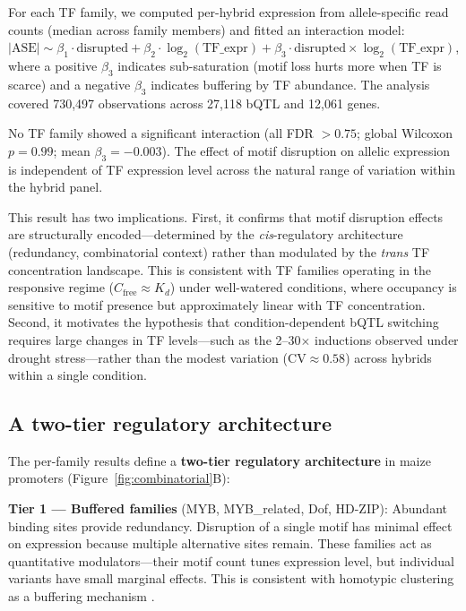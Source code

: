 \documentclass[11pt,a4paper]{article}
\begin{document}
For each TF family, we computed per-hybrid expression from allele-specific read counts (median across family members) and fitted an interaction model: $|\text{ASE}| \sim \beta_1 \cdot \text{disrupted} + \beta_2 \cdot \log_2(\text{TF\_expr}) + \beta_3 \cdot \text{disrupted} \times \log_2(\text{TF\_expr})$, where a positive $\beta_3$ indicates sub-saturation (motif loss hurts more when TF is scarce) and a negative $\beta_3$ indicates buffering by TF abundance. The analysis covered 730,497 observations across 27,118 bQTL and 12,061 genes.

No TF family showed a significant interaction (all FDR $> 0.75$; global Wilcoxon $p = 0.99$; mean $\beta_3 = -0.003$). The effect of motif disruption on allelic expression is independent of TF expression level across the natural range of variation within the hybrid panel.

This result has two implications. First, it confirms that motif disruption effects are structurally encoded---determined by the \emph{cis}-regulatory architecture (redundancy, combinatorial context) rather than modulated by the \emph{trans} TF concentration landscape. This is consistent with TF families operating in the responsive regime ($C_\text{free} \approx K_d$) under well-watered conditions, where occupancy is sensitive to motif presence but approximately linear with TF concentration. Second, it motivates the hypothesis that condition-dependent bQTL switching requires large changes in TF levels---such as the 2--30$\times$ inductions observed under drought stress---rather than the modest variation ($\text{CV} \approx 0.58$) across hybrids within a single condition.

\subsection{A two-tier regulatory architecture}

The per-family results define a \textbf{two-tier regulatory architecture} in maize promoters (Figure~\ref{fig:combinatorial}B):

\textbf{Tier 1 --- Buffered families} (MYB, MYB\_related, Dof, HD-ZIP): Abundant binding sites provide redundancy. Disruption of a single motif has minimal effect on expression because multiple alternative sites remain. These families act as quantitative modulators---their motif count tunes expression level, but individual variants have small marginal effects. This is consistent with homotypic clustering as a buffering mechanism \citep{gotea2010}.
\end{document}
